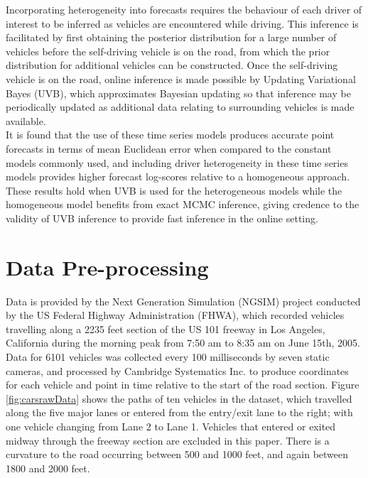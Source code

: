 \documentclass[
12pt, %
onehalfspacing, %
nohyperref, %
headsepline, %
chapterinoneline, %
]{MastersDoctoralThesis} %
\begin{document}
Incorporating heterogeneity into forecasts requires the behaviour of each driver of interest to be inferred as vehicles are encountered while driving. This inference is facilitated by first obtaining the posterior distribution for a large number of vehicles before the self-driving vehicle is on the road, from which the prior distribution for additional vehicles can be constructed. Once the self-driving vehicle is on the road, online inference is made possible by Updating Variational Bayes (UVB), which approximates Bayesian updating so that inference may be periodically updated as additional data relating to surrounding vehicles is made available. 
\\

It is found that the use of these time series models produces accurate point forecasts in terms of mean Euclidean error when compared to the constant models commonly used, and including driver heterogeneity in these time series models provides higher forecast log-scores relative to a homogeneous approach. These results hold when UVB is used for the heterogeneous models while the homogeneous model benefits from exact MCMC inference, giving credence to the validity of UVB inference to provide fast inference in the online setting.
\\

\section{Data Pre-processing}
\label{sec:carsdataProcessing}
Data is provided by the Next Generation Simulation (NGSIM) project conducted by the US Federal Highway Administration (FHWA), which recorded vehicles travelling along a 2235 feet section of the US 101 freeway in Los Angeles, California during the morning peak from 7:50 am to 8:35 am on June 15th, 2005. Data for 6101 vehicles was collected every 100 milliseconds by seven static cameras, and processed by Cambridge Systematics Inc. to produce coordinates for each vehicle and point in time relative to the start of the road section. 
Figure \ref{fig:carsrawData} shows the paths of ten vehicles in the dataset, which travelled along the five major lanes or entered from the entry/exit lane to the right; with one vehicle changing from Lane 2 to Lane 1. Vehicles that entered or exited midway through the freeway section are excluded in this paper. There is a curvature to the road occurring between 500 and 1000 feet, and again between 1800 and 2000 feet.
\\
\end{document}
